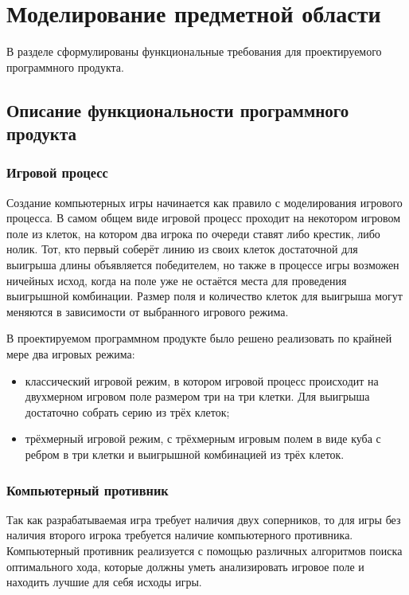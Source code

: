 \section{Моделирование предметной области}

В разделе сформулированы функциональные требования для проектируемого программного продукта.


\subsection{Описание функциональности программного продукта}


\subsubsection{Игровой процесс}

Создание компьютерных игры начинается как правило с моделирования игрового процесса. В самом общем виде игровой процесс проходит на некотором игровом поле из клеток, на котором два игрока по очереди ставят либо крестик, либо нолик. Тот, кто первый соберёт линию из своих клеток достаточной для выигрыша длины объявляется победителем, но также в процессе игры возможен ничейных исход, когда на поле уже не остаётся места для проведения выигрышной комбинации. Размер поля и количество клеток для выигрыша могут меняются в зависимости от выбранного игрового режима.

В проектируемом программном продукте было решено реализовать по крайней мере два игровых режима:
\begin{itemize}
    \item классический игровой режим, в котором игровой процесс происходит на двухмерном игровом поле размером три на три клетки. Для выигрыша достаточно собрать серию из трёх клеток;
    \item трёхмерный игровой режим, с трёхмерным игровым полем в виде куба с ребром в три клетки и выигрышной комбинацией из трёх клеток.
\end{itemize}

\subsubsection{Компьютерный противник}

Так как разрабатываемая игра требует наличия двух соперников, то для игры без наличия второго игрока требуется наличие компьютерного противника. Компьютерный противник реализуется с помощью различных алгоритмов поиска оптимального хода, которые должны уметь анализировать игровое поле и находить лучшие для себя исходы игры.

